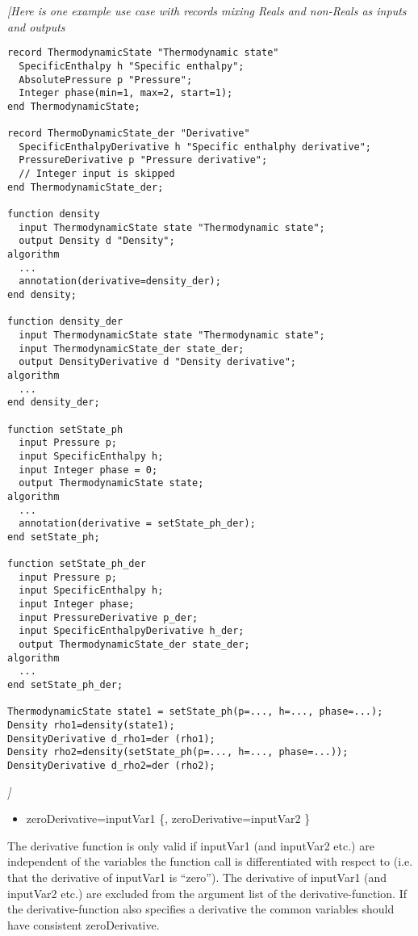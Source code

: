 \emph{{[}Here is one example use case with records mixing Reals and
non-Reals as inputs and outputs}

\begin{lstlisting}[language=modelica]
record ThermodynamicState "Thermodynamic state"
  SpecificEnthalpy h "Specific enthalpy";
  AbsolutePressure p "Pressure";
  Integer phase(min=1, max=2, start=1);
end ThermodynamicState;

record ThermoDynamicState_der "Derivative"
  SpecificEnthalpyDerivative h "Specific enthalphy derivative";
  PressureDerivative p "Pressure derivative";
  // Integer input is skipped
end ThermodynamicState_der;

function density
  input ThermodynamicState state "Thermodynamic state";
  output Density d "Density";
algorithm 
  ...
  annotation(derivative=density_der);
end density;

function density_der
  input ThermodynamicState state "Thermodynamic state";
  input ThermodynamicState_der state_der;
  output DensityDerivative d "Density derivative";
algorithm 
  ...
end density_der;

function setState_ph
  input Pressure p;
  input SpecificEnthalpy h;
  input Integer phase = 0;
  output ThermodynamicState state;
algorithm
  ...
  annotation(derivative = setState_ph_der);
end setState_ph;

function setState_ph_der
  input Pressure p;
  input SpecificEnthalpy h;
  input Integer phase;
  input PressureDerivative p_der;
  input SpecificEnthalpyDerivative h_der;
  output ThermodynamicState_der state_der;
algorithm
  ...
end setState_ph_der;

ThermodynamicState state1 = setState_ph(p=..., h=..., phase=...);
Density rho1=density(state1);
DensityDerivative d_rho1=der (rho1);
Density rho2=density(setState_ph(p=..., h=..., phase=...));
DensityDerivative d_rho2=der (rho2);
\end{lstlisting}
\emph{{]}}

\begin{itemize}
\item
  zeroDerivative=inputVar1 \{, zeroDerivative=inputVar2 \}
\end{itemize}

The derivative function is only valid if inputVar1 (and inputVar2 etc.)
are independent of the variables the function call is differentiated
with respect to (i.e. that the derivative of inputVar1 is ``zero''). The
derivative of inputVar1 (and inputVar2 etc.) are excluded from the
argument list of the derivative-function. If the derivative-function
also specifies a derivative the common variables should have consistent
zeroDerivative.

